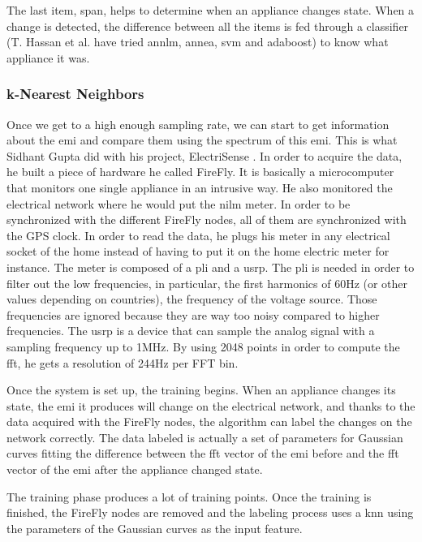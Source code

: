The last item, span, helps to determine when an appliance changes state. When a change is detected, the difference between all the items is fed through a classifier (T. Hassan et al. have tried \acrshort{annlm}, \acrshort{annea}, \acrshort{svm} and \acrshort{adaboost}\cite{hassan2014empirical}) to know what appliance it was. 

\subsubsection{k-Nearest Neighbors}\label{section:high-freq}
Once we get to a high enough sampling rate, we can start to get information about the \acrfull{emi} and compare them using the spectrum of this \acrshort{emi}. This is what Sidhant Gupta did with his project, ElectriSense \cite{gupta2010electrisense}. In order to acquire the data, he built a piece of hardware he called FireFly. It is basically a microcomputer that monitors one single appliance in an intrusive way. He also monitored the electrical network where he would put the \acrshort{nilm} meter. In order to be synchronized with the different FireFly nodes, all of them are synchronized with the GPS clock.
In order to read the data, he plugs his meter in any electrical socket of the home instead of having to put it on the home electric meter for instance. The meter is composed of a \acrfull{pli} and a \acrfull{usrp}. The \acrshort{pli} is needed in order to filter out the low frequencies, in particular, the first harmonics of 60Hz (or other values depending on countries), the frequency of the voltage source. Those frequencies are ignored because they are way too noisy compared to higher frequencies. The \acrshort{usrp} is a device that can sample the analog signal with a sampling frequency up to 1MHz. By using 2048 points in order to compute the \acrshort{fft}, he gets a resolution of 244Hz per FFT bin.

Once the system is set up, the training begins. When an appliance changes its state, the \acrshort{emi} it produces will change on the electrical network, and thanks to the data acquired with the FireFly nodes, the algorithm can label the changes on the network correctly. The data labeled is actually a set of parameters for Gaussian curves fitting the difference between the \acrshort{fft} vector of the \acrshort{emi} before and the \acrshort{fft} vector of the \acrshort{emi} after the appliance changed state.

The training phase produces a lot of training points. Once the training is finished, the FireFly nodes are removed and the labeling process uses a \acrshort{knn} using the parameters of the Gaussian curves as the input feature.

